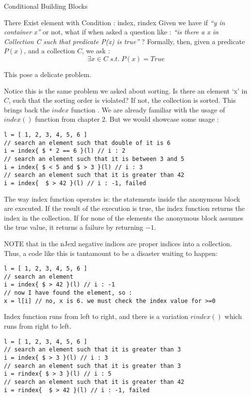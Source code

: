 \begin{section}{Conditional Building Blocks}
\begin{subsection}{There Exist element with Condition : index, rindex }
Given we have if \emph{``y in container x''} or not,
what if when asked a question like : \emph{ ``is there a x in Collection C such that predicate P(x) is true''} ?
Formally, then, given a predicate $P(x)$, and a collection $C$, we ask :
$$
\exists x \in C \;s.t.\; P(x) = True
$$

This pose a delicate problem. 

Notice this is the same problem we asked about sorting. Is there an element `x' in $C$, 
such that the sorting order is violated? If not, the collection is sorted.
This brings back the $index$ function .
We are already familiar with the usage of $index()$ function from chapter 2.
But we would showcase some usage :
 
\begin{lstlisting}[style=JexlStyle]
l = [ 1, 2, 3, 4, 5, 6 ]
// search an element such that double of it is 6
i = index{ $ * 2 == 6 }(l) // i : 2 
// search an element such that it is between 3 and 5 
i = index{ $ < 5 and $ > 3 }(l) // i : 3 
// search an element such that it is greater than 42
i = index{  $ > 42 }(l) // i : -1, failed 
\end{lstlisting}

The way index function operates is: the statements inside the anonymous block are executed.
If the result of the execution is true, the index function returns the index in the collection.
If for none of the elements the anonymous block assumes the true value, it returns a failure by returning $-1$.

NOTE that in the nJexl negative indices are proper indices into a collection.
Thus, a code like this is tantamount to be a disaster waiting to happen:
 
\begin{lstlisting}[style=JexlStyle]
l = [ 1, 2, 3, 4, 5, 6 ]
// search an element   
i = index{ $ > 42 }(l) // i : -1
// now I have found the element, so :
x = l[i] // no, x is 6. we must check the index value for >=0
\end{lstlisting}


Index function runs from left to right, and there is a variation $rindex()$ 
which runs from right to left.


\begin{lstlisting}[style=JexlStyle]
l = [ 1, 2, 3, 4, 5, 6 ]
// search an element such that it is greater than 3  
i = index{ $ > 3 }(l) // i : 3
// search an element such that it is greater than 3  
i = rindex{ $ > 3 }(l) // i : 5 
// search an element such that it is greater than 42
i = rindex{  $ > 42 }(l) // i : -1, failed 
\end{lstlisting}


\end{subsection}
\end{section}
